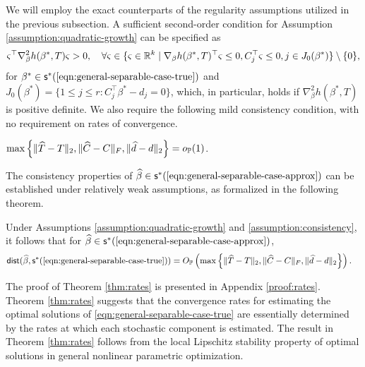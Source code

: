 We will employ the exact counterparts of the regularity assumptions utilized in the previous subsection. A sufficient second-order condition for Assumption \ref{assumption:quadratic-growth} can be specified as
\begin{align*}
    \varsigma^\top\nabla_{\beta}^2h(\beta^*,T)\varsigma > 0, \quad \forall \varsigma \in \{\varsigma \in \mathbb{R}^k \mid \nabla_{\beta} h(\beta^*,T)^\top\varsigma \leq 0, C_j^\top\varsigma \leq 0, j \in J_0(\beta^*) \} \setminus \{0\},
\end{align*}
for $\beta^* \in \mathsf{s}^*(\text{\ref{eqn:general-separable-case-true}})$ and $J_0(\beta^*)=\{1\leq j \leq r : C_j^\top \beta^* - d_j = 0 \}$,
which, in particular, holds if $\nabla_{\beta}^2 h(\beta^*,T)$ is positive definite. We also require the following mild consistency condition, with no requirement on rates of convergence.
\begin{assumption} \label{assumption:consistency}
    $\max\left\{ \Vert \widehat{T} - T \Vert_2, \Vert \widehat{C} - C \Vert_F, \Vert \widehat{d} - d \Vert_2 \right\} = o_{\mathbb{P}}(1)$.
\end{assumption}

The consistency properties of $\widehat{\beta} \in \mathsf{s}^*(\text{\ref{eqn:general-separable-case-approx}})$ can be established under relatively weak assumptions, as formalized in the following theorem.
\begin{theorem} \label{thm:rates} 
Under Assumptions \ref{assumption:quadratic-growth} and \ref{assumption:consistency}, it follows that for $\widehat{\beta} \in \mathsf{s}^*(\text{\ref{eqn:general-separable-case-approx}})$,
\begin{align*} 
     \textsf{dist}(\widehat{\beta}, \mathsf{s}^*(\text{\ref{eqn:general-separable-case-true}}))
     &= O_{\mathbb{P}}\left( \max\left\{ \Vert \widehat{T} - T \Vert_2, \Vert \widehat{C} - C \Vert_F, \Vert \widehat{d} - d \Vert_2 \right\}\right).    
\end{align*}
\end{theorem}
The proof of Theorem \ref{thm:rates} is presented in Appendix \ref{proof:rates}.
Theorem \ref{thm:rates} suggests that the convergence rates for estimating the optimal solutions of \ref{eqn:general-separable-case-true} are essentially determined by the rates at which each stochastic component is estimated. 
The result in Theorem \ref{thm:rates} follows from the local Lipschitz stability property of optimal solutions in general nonlinear parametric optimization. %

